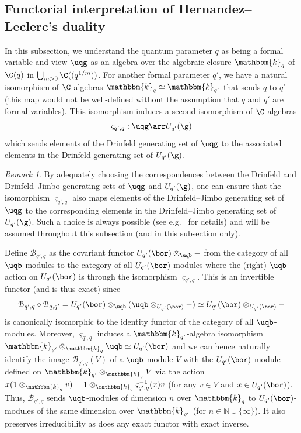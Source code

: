 \documentclass[11pt]{amsart}
\theoremstyle{definition}
\theoremstyle{remark}
\newtheorem{rem}[theorem]{Remark}
\numberwithin{equation}{section}
\begin{document}
\subsection{Functorial interpretation of Hernandez--Leclerc's duality}\label{sec:FuncD}
In this subsection, we understand the quantum parameter $q$ as being a formal variable and view $\uqg$ as an algebra over the algebraic closure $\mathbbm{k}_q$ of $\C(q)$ in $\bigcup_{m>0} \C((q^{1/m}))$. For another formal parameter $q'$, we have a natural isomorphism of $\C$-algebras $\mathbbm{k}_q\simeq \mathbbm{k}_{q'}$ that sends $q$ to $q'$ (this map would not be well-defined without the assumption that $q$ and $q'$ are formal variables). This isomorphism induces a second isomorphism of $\C$-algebras $$\varsigma_{q',q}:\uqg\arr U_{q'}(\g)$$ which sends elements of the Drinfeld generating set of $\uqg$ to the associated elements in the Drinfeld generating set of $U_{q'}(\g)$. 
\begin{rem}\label{rem:DJB} By adequately choosing the correspondences between the Drinfeld and Drinfeld--Jimbo generating sets of $\uqg$ and $U_{q'}(\g)$, one can ensure that the isomorphism $\varsigma_{q',q}$ also maps elements of the Drinfeld--Jimbo generating set of $\uqg$ to the corresponding elements in the Drinfeld--Jimbo generating set of $U_{q'}(\g)$. Such a choice is always possible (see e.g.~\cite[Section 2.2]{hj} for details) and will be assumed throughout this subsection (and in this subsection only).  
\end{rem} 
Define $\mathcal{B}_{q',q}$ as the covariant functor $U_{q'}(\bor)\otimes_{\uqb} - $ from the category of all $\uqb$-modules to the category of all $U_{q'}(\bor)$-modules where the (right) $\uqb$-action on $U_{q'}(\bor)$ is through the isomorphism $\varsigma_{q',q}$. This is an invertible functor (and is thus exact) since 
$$ \mathcal{B}_{q',q} \circ \mathcal{B}_{q,q'} = U_{q'}(\bor)\otimes_{\uqb} (\uqb \otimes_{U_{q'}(\bor)} -) \simeq U_{q'}(\bor) \otimes_{U_{q'}(\bor)} -$$
is canonically isomorphic to the identity functor of the category of all $\uqb$-modules. Moreover, $\varsigma_{q',q}$ induces a $\mathbbm{k}_{q'}$-algebra isomorphism $\mathbbm{k}_{q'}\otimes_{\mathbbm{k}_q} \uqb\simeq U_{q'}(\bor)$ and we can hence naturally identify the image $\mathcal{B}_{q',q}(V)$ of a $\uqb$-module $V$ with the $U_{q'}(\bor)$-module defined on $\mathbbm{k}_{q'}\otimes_{\mathbbm{k}_q} V$ via the action $x(1\otimes_{\mathbbm{k}_q}v) = 1\otimes_{\mathbbm{k}_q} \varsigma_{q',q}^{-1}(x)v$ (for any $v\in V$ and $x\in U_{q'}(\bor)$). Thus, $\mathcal{B}_{q',q}$ sends $\uqb$-modules of dimension $n$ over $\mathbbm{k}_q$ to $U_{q'}(\bor)$-modules of the same dimension over $\mathbbm{k}_{q'}$ (for $n\in \mathbb{N}\cup\{\infty\}$). It also preserves irreducibility as does any exact functor with exact inverse.
\end{document}
